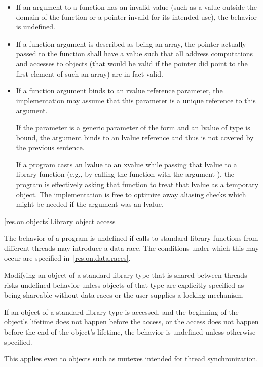 \begin{itemize}
\item
If an argument to a function has an invalid value (such
%
as a value outside the domain of the function or a pointer invalid for its
intended use), the behavior is undefined.
%

\item
If a function argument is described as being an array,
%
the pointer actually passed to the function shall have a value such that all
address computations and accesses to objects (that would be valid if the
pointer did point to the first element of such an array) are in fact valid.

\item
If a function argument binds to an rvalue reference parameter, the implementation may
assume that this parameter is a unique reference to this argument.
\begin{note}
If the parameter is a generic parameter of the form  and an lvalue of type
 is bound, the argument binds to an lvalue reference
and thus is not covered by the previous sentence.
\end{note}
\begin{note}
If a program casts
an lvalue to an xvalue while passing that lvalue to a library function
(e.g., by calling the function with the argument ), the program
is effectively asking that function to treat that lvalue as a temporary object.
The implementation
is free to optimize away aliasing checks which might be needed if the argument was
an lvalue.
\end{note}
\end{itemize}

[res.on.objects]{Library object access}

\pnum
The behavior of a program is undefined if calls to standard library functions from different
threads may introduce a data race. The conditions under which this may occur are specified
in~\ref{res.on.data.races}.
\begin{note}
Modifying an object of a standard library type that is
shared between threads risks undefined behavior unless objects of that type are explicitly
specified as being shareable without data races or the user supplies a locking mechanism.
\end{note}

\pnum
If an object of a standard library type is accessed, and
the beginning of the object's lifetime
does not happen before the access, or
the access does not happen before the end of the object's lifetime,
the behavior is undefined unless otherwise specified.
\begin{note}
This applies even to objects such as mutexes intended for thread synchronization.
\end{note}

